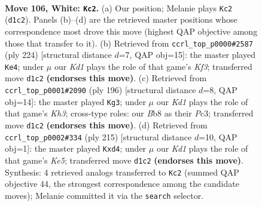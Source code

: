 \documentclass[11pt]{article}
\begin{document}
\clearpage

\begin{figure}[p]\centering
\begin{subfigure}{0.46\textwidth}\centering
\resizebox{\linewidth}{!}{%
\newchessgame
\chessboard[
  setfen={1B5k/8/8/5R1P/8/4rp2/8/3K4 w - - 4 106},
  showmover=false,
  pgfstyle=straightmove, color=movearrow, markmove={d1-c2}
]}
\caption{}
\end{subfigure}\hfill
\begin{subfigure}{0.46\textwidth}\centering
\resizebox{\linewidth}{!}{%
\newchessgame
\chessboard[
  setfen={8/6k1/3PR2p/7r/8/5K2/8/8 w - - 1 113},
  showmover=false,
  pgfstyle=straightmove, color=movearrow, markmove={f3-e4}
]}
\caption{}
\end{subfigure}
\\[4pt]
\begin{subfigure}{0.46\textwidth}\centering
\resizebox{\linewidth}{!}{%
\newchessgame
\chessboard[
  setfen={1r6/8/6k1/1p2R3/8/2P2P1K/8/8 w - - 3 99},
  showmover=false,
  pgfstyle=straightmove, color=movearrow, markmove={h3-g3}
]}
\caption{}
\end{subfigure}\hfill
\begin{subfigure}{0.46\textwidth}\centering
\resizebox{\linewidth}{!}{%
\newchessgame
\chessboard[
  setfen={7R/8/8/8/2pPk3/8/2r5/4K3 b - - 7 108},
  showmover=false,
  pgfstyle=straightmove, color=movearrow, markmove={e4-d4}
]}
\caption{}
\end{subfigure}
\caption{\textbf{Move 106, White: \texttt{Kc2}.} (a) Our position; Melanie plays \texttt{Kc2} (\texttt{d1c2}). Panels (b)--(d) are the retrieved master positions whose correspondence most drove this move (highest QAP objective among those that transfer to it). (b) Retrieved from \texttt{ccrl\_top\_p0000\#2587} (ply 224) [structural distance $d$=7, QAP obj=15]: the master played \texttt{Ke4}; under $\mu$ our \emph{Kd1} plays the role of that game's \emph{Kf3}; transferred move \texttt{d1c2} \textbf{(endorses this move)}. (c) Retrieved from \texttt{ccrl\_top\_p0001\#2090} (ply 196) [structural distance $d$=8, QAP obj=14]: the master played \texttt{Kg3}; under $\mu$ our \emph{Kd1} plays the role of that game's \emph{Kh3}; cross-type roles: our \emph{B}b8 as their \emph{P}c3; transferred move \texttt{d1c2} \textbf{(endorses this move)}. (d) Retrieved from \texttt{ccrl\_top\_p0002\#334} (ply 215) [structural distance $d$=10, QAP obj=1]: the master played \texttt{Kxd4}; under $\mu$ our \emph{Kd1} plays the role of that game's \emph{Ke5}; transferred move \texttt{d1c2} \textbf{(endorses this move)}. Synthesis: 4 retrieved analogs transferred to \texttt{Kc2} (summed QAP objective 44, the strongest correspondence among the candidate moves); Melanie committed it via the \texttt{search} selector.}
\label{fig:thought-m210}
\end{figure}
\end{document}
